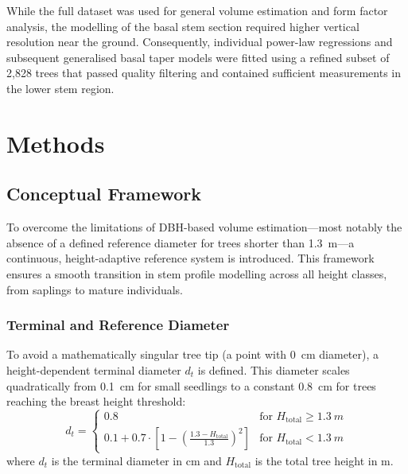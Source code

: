\documentclass[twocolumn, bibliography=totoc]{scrartcl}
\begin{document}
While the full dataset was used for general volume estimation and form factor analysis, the modelling of the basal stem section required higher vertical resolution near the ground. Consequently, individual power-law regressions and subsequent generalised basal taper models were fitted using a refined subset of 2,828 trees that passed quality filtering and contained sufficient measurements in the lower stem region.


\section{Methods}
\subsection{Conceptual Framework}

To overcome the limitations of DBH-based volume estimation—most notably the absence of a defined reference diameter for trees shorter than \qty{1.3}{m}—a continuous, height-adaptive reference system is introduced. This framework ensures a smooth transition in stem profile modelling across all height classes, from saplings to mature individuals.

\subsubsection{Terminal and Reference Diameter}

To avoid a mathematically singular tree tip (a point with \qty{0}{cm} diameter), a height-dependent terminal diameter $d_t$ is defined. This diameter scales quadratically from \qty{0.1}{cm} for small seedlings to a constant \qty{0.8}{cm} for trees reaching the breast height threshold:
\begin{equation}
d_t =
\begin{cases}
0.8 & \text{for } H_{\text{total}} \geq \qty{1.3}{m} \\
0.1 + 0.7 \cdot \left[ 1 - \left( \frac{1.3 - H_{\text{total}}}{1.3} \right)^2 \right] & \text{for } H_{\text{total}} < \qty{1.3}{m}
\end{cases}
\end{equation}
where $d_t$ is the terminal diameter in \unit{cm} and $H_{\text{total}}$ is the total tree height in \unit{m}.
\end{document}
